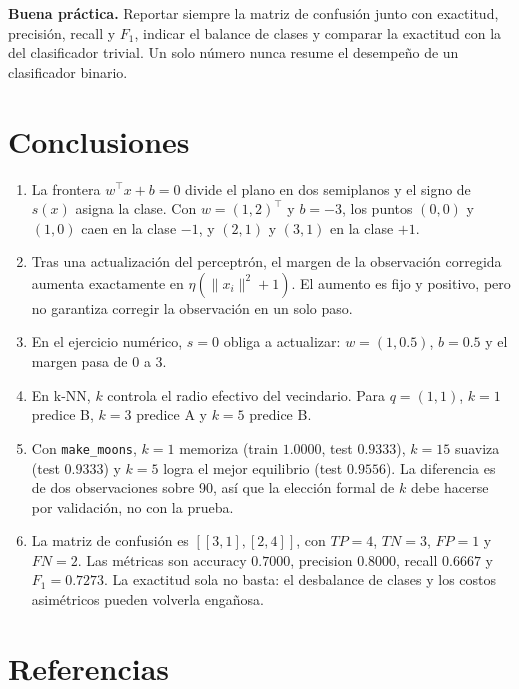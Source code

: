 \documentclass[12pt,a4paper]{article}
\newcommand{\norm}[1]{\lVert #1\rVert}
\begin{document}
\begin{cajaRes}
  \textbf{Buena práctica.} Reportar siempre la matriz de confusión junto con
  exactitud, precisión, recall y $F_1$, indicar el balance de clases y comparar
  la exactitud con la del clasificador trivial. Un solo número nunca resume el
  desempeño de un clasificador binario.
\end{cajaRes}

\section*{Conclusiones}

\begin{enumerate}[leftmargin=1.4em,itemsep=0.3em]
  \item La frontera $w^\top x+b=0$ divide el plano en dos semiplanos y el signo
  de $s(x)$ asigna la clase. Con $w=(1,2)^\top$ y $b=-3$, los puntos $(0,0)$ y
  $(1,0)$ caen en la clase $-1$, y $(2,1)$ y $(3,1)$ en la clase $+1$.
  \item Tras una actualización del perceptrón, el margen de la observación
  corregida aumenta exactamente en $\eta(\norm{x_i}^2+1)$. El aumento es fijo y
  positivo, pero no garantiza corregir la observación en un solo paso.
  \item En el ejercicio numérico, $s=0$ obliga a actualizar: $w=(1,0.5)$,
  $b=0.5$ y el margen pasa de $0$ a $3$.
  \item En k-NN, $k$ controla el radio efectivo del vecindario. Para $q=(1,1)$,
  $k=1$ predice B, $k=3$ predice A y $k=5$ predice B.
  \item Con \texttt{make\_moons}, $k=1$ memoriza (train $1.0000$, test
  $0.9333$), $k=15$ suaviza (test $0.9333$) y $k=5$ logra el mejor equilibrio
  (test $0.9556$). La diferencia es de dos observaciones sobre 90, así que la
  elección formal de $k$ debe hacerse por validación, no con la prueba.
  \item La matriz de confusión es $[[3,1],[2,4]]$, con $TP=4$, $TN=3$, $FP=1$ y
  $FN=2$. Las métricas son accuracy $0.7000$, precision $0.8000$, recall
  $0.6667$ y $F_1=0.7273$. La exactitud sola no basta: el desbalance de clases
  y los costos asimétricos pueden volverla engañosa.
\end{enumerate}

\section*{Referencias}
\end{document}
